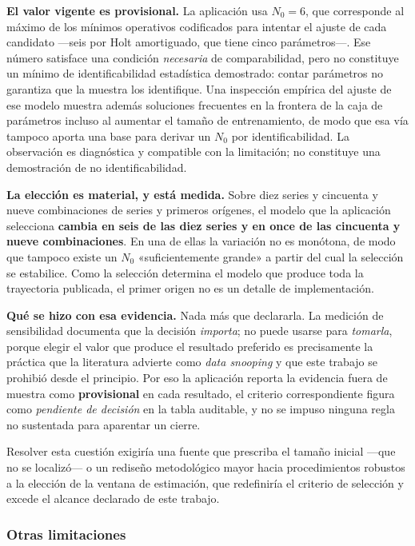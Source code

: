 \documentclass[12pt,letterpaper]{article}
\begin{document}
\textbf{El valor vigente es provisional.} La aplicación usa \(N_0 = 6\), que
corresponde al máximo de los mínimos operativos codificados para intentar el
ajuste de cada candidato ---seis por Holt amortiguado, que tiene cinco
parámetros---. Ese número satisface una condición \emph{necesaria} de
comparabilidad, pero no constituye un mínimo de identificabilidad estadística
demostrado: contar parámetros no garantiza que la muestra los identifique. Una
inspección empírica del ajuste de ese modelo muestra además soluciones
frecuentes en la frontera de la caja de parámetros incluso al aumentar el tamaño
de entrenamiento, de modo que esa vía tampoco aporta una base para derivar un
\(N_0\) por identificabilidad. La observación es diagnóstica y compatible con la
limitación; no constituye una demostración de no identificabilidad.

\textbf{La elección es material, y está medida.} Sobre diez series y cincuenta y
nueve combinaciones de series y primeros orígenes, el modelo que la aplicación
selecciona \textbf{cambia en seis de las diez series y en once de las cincuenta y
nueve combinaciones}. En una de ellas la variación no es monótona, de modo que
tampoco existe un \(N_0\) «suficientemente grande» a partir del cual la selección
se estabilice. Como la selección determina el modelo que produce toda la
trayectoria publicada, el primer origen no es un detalle de implementación.

\textbf{Qué se hizo con esa evidencia.} Nada más que declararla. La medición de
sensibilidad documenta que la decisión \emph{importa}; no puede usarse para
\emph{tomarla}, porque elegir el valor que produce el resultado preferido es
precisamente la práctica que la literatura advierte como \emph{data snooping} y
que este trabajo se prohibió desde el principio. Por eso la aplicación reporta la
evidencia fuera de muestra como \textbf{provisional} en cada resultado, el
criterio correspondiente figura como \emph{pendiente de decisión} en la tabla
auditable, y no se impuso ninguna regla no sustentada para aparentar un cierre.

Resolver esta cuestión exigiría una fuente que prescriba el tamaño inicial ---que
no se localizó--- o un rediseño metodológico mayor hacia procedimientos robustos
a la elección de la ventana de estimación, que redefiniría el criterio de
selección y excede el alcance declarado de este trabajo.

\subsubsection*{Otras limitaciones}
\end{document}
